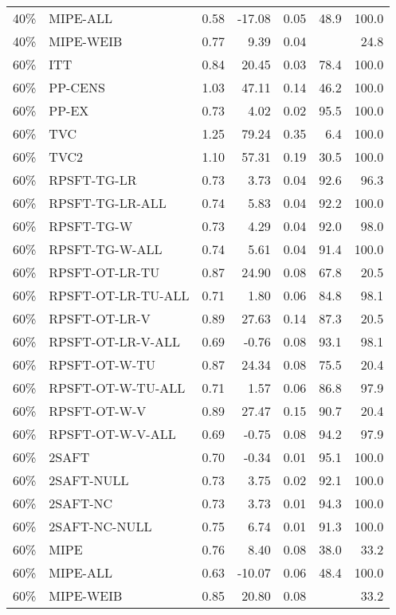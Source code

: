 \begin{table}[ht]
{\begin{tabular}{llrrrrr}
  40\% & MIPE-ALL & 0.58 & -17.08 & 0.05 & 48.9 & 100.0 \\ 
  40\% & MIPE-WEIB & 0.77 & 9.39 & 0.04 &  & 24.8 \\ 
   \hline
60\% & ITT & 0.84 & 20.45 & 0.03 & 78.4 & 100.0 \\ 
  60\% & PP-CENS & 1.03 & 47.11 & 0.14 & 46.2 & 100.0 \\ 
  60\% & PP-EX & 0.73 & 4.02 & 0.02 & 95.5 & 100.0 \\ 
  60\% & TVC & 1.25 & 79.24 & 0.35 & 6.4 & 100.0 \\ 
  60\% & TVC2 & 1.10 & 57.31 & 0.19 & 30.5 & 100.0 \\ 
   \hline
60\% & RPSFT-TG-LR & 0.73 & 3.73 & 0.04 & 92.6 & 96.3 \\ 
  60\% & RPSFT-TG-LR-ALL & 0.74 & 5.83 & 0.04 & 92.2 & 100.0 \\ 
  60\% & RPSFT-TG-W & 0.73 & 4.29 & 0.04 & 92.0 & 98.0 \\ 
  60\% & RPSFT-TG-W-ALL & 0.74 & 5.61 & 0.04 & 91.4 & 100.0 \\ 
  60\% & RPSFT-OT-LR-TU & 0.87 & 24.90 & 0.08 & 67.8 & 20.5 \\ 
  60\% & RPSFT-OT-LR-TU-ALL & 0.71 & 1.80 & 0.06 & 84.8 & 98.1 \\ 
  60\% & RPSFT-OT-LR-V & 0.89 & 27.63 & 0.14 & 87.3 & 20.5 \\ 
  60\% & RPSFT-OT-LR-V-ALL & 0.69 & -0.76 & 0.08 & 93.1 & 98.1 \\ 
   \hline
60\% & RPSFT-OT-W-TU & 0.87 & 24.34 & 0.08 & 75.5 & 20.4 \\ 
  60\% & RPSFT-OT-W-TU-ALL & 0.71 & 1.57 & 0.06 & 86.8 & 97.9 \\ 
  60\% & RPSFT-OT-W-V & 0.89 & 27.47 & 0.15 & 90.7 & 20.4 \\ 
  60\% & RPSFT-OT-W-V-ALL & 0.69 & -0.75 & 0.08 & 94.2 & 97.9 \\ 
   \hline
60\% & 2SAFT & 0.70 & -0.34 & 0.01 & 95.1 & 100.0 \\ 
  60\% & 2SAFT-NULL & 0.73 & 3.75 & 0.02 & 92.1 & 100.0 \\ 
  60\% & 2SAFT-NC & 0.73 & 3.73 & 0.01 & 94.3 & 100.0 \\ 
  60\% & 2SAFT-NC-NULL & 0.75 & 6.74 & 0.01 & 91.3 & 100.0 \\ 
  60\% & MIPE & 0.76 & 8.40 & 0.08 & 38.0 & 33.2 \\ 
  60\% & MIPE-ALL & 0.63 & -10.07 & 0.06 & 48.4 & 100.0 \\ 
  60\% & MIPE-WEIB & 0.85 & 20.80 & 0.08 &  & 33.2 \\ 
   \hline
\end{tabular}
}
\end{table}
